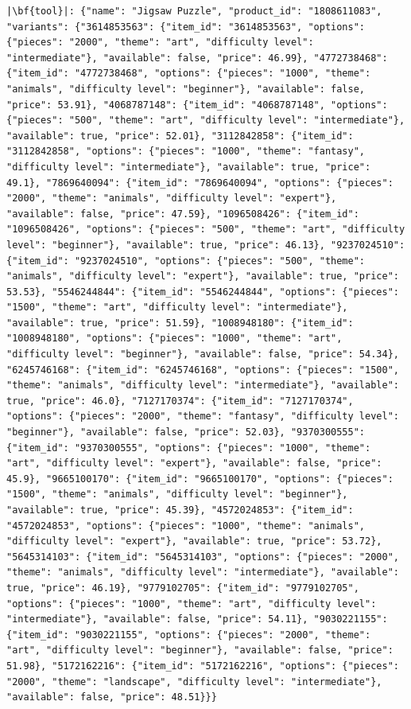 \begin{verbatim}
|\bf{tool}|: {"name": "Jigsaw Puzzle", "product_id": "1808611083", "variants": {"3614853563": {"item_id": "3614853563", "options": {"pieces": "2000", "theme": "art", "difficulty level": "intermediate"}, "available": false, "price": 46.99}, "4772738468": {"item_id": "4772738468", "options": {"pieces": "1000", "theme": "animals", "difficulty level": "beginner"}, "available": false, "price": 53.91}, "4068787148": {"item_id": "4068787148", "options": {"pieces": "500", "theme": "art", "difficulty level": "intermediate"}, "available": true, "price": 52.01}, "3112842858": {"item_id": "3112842858", "options": {"pieces": "1000", "theme": "fantasy", "difficulty level": "intermediate"}, "available": true, "price": 49.1}, "7869640094": {"item_id": "7869640094", "options": {"pieces": "2000", "theme": "animals", "difficulty level": "expert"}, "available": false, "price": 47.59}, "1096508426": {"item_id": "1096508426", "options": {"pieces": "500", "theme": "art", "difficulty level": "beginner"}, "available": true, "price": 46.13}, "9237024510": {"item_id": "9237024510", "options": {"pieces": "500", "theme": "animals", "difficulty level": "expert"}, "available": true, "price": 53.53}, "5546244844": {"item_id": "5546244844", "options": {"pieces": "1500", "theme": "art", "difficulty level": "intermediate"}, "available": true, "price": 51.59}, "1008948180": {"item_id": "1008948180", "options": {"pieces": "1000", "theme": "art", "difficulty level": "beginner"}, "available": false, "price": 54.34}, "6245746168": {"item_id": "6245746168", "options": {"pieces": "1500", "theme": "animals", "difficulty level": "intermediate"}, "available": true, "price": 46.0}, "7127170374": {"item_id": "7127170374", "options": {"pieces": "2000", "theme": "fantasy", "difficulty level": "beginner"}, "available": false, "price": 52.03}, "9370300555": {"item_id": "9370300555", "options": {"pieces": "1000", "theme": "art", "difficulty level": "expert"}, "available": false, "price": 45.9}, "9665100170": {"item_id": "9665100170", "options": {"pieces": "1500", "theme": "animals", "difficulty level": "beginner"}, "available": true, "price": 45.39}, "4572024853": {"item_id": "4572024853", "options": {"pieces": "1000", "theme": "animals", "difficulty level": "expert"}, "available": true, "price": 53.72}, "5645314103": {"item_id": "5645314103", "options": {"pieces": "2000", "theme": "animals", "difficulty level": "intermediate"}, "available": true, "price": 46.19}, "9779102705": {"item_id": "9779102705", "options": {"pieces": "1000", "theme": "art", "difficulty level": "intermediate"}, "available": false, "price": 54.11}, "9030221155": {"item_id": "9030221155", "options": {"pieces": "2000", "theme": "art", "difficulty level": "beginner"}, "available": false, "price": 51.98}, "5172162216": {"item_id": "5172162216", "options": {"pieces": "2000", "theme": "landscape", "difficulty level": "intermediate"}, "available": false, "price": 48.51}}}



\end{verbatim}
